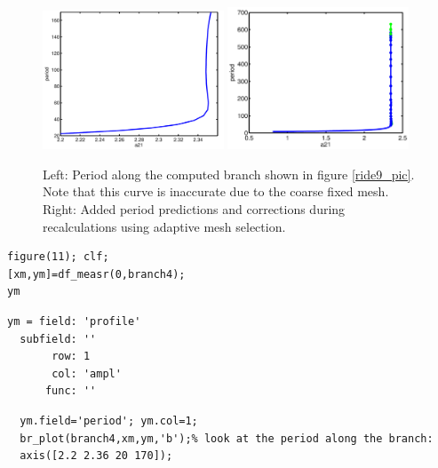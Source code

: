 \documentclass[10pt]{scrartcl}
\begin{document}
\begin{figure}[h]
\begin{center}
\includegraphics[width=0.48\textwidth]{fig/demo1figa11}
\includegraphics[width=0.48\textwidth]{fig/demo1fig11}
\end{center}
\caption{\label{ride11_pic}Left: Period along the computed branch
  shown in figure \ref{ride9_pic}. Note that this curve is inaccurate
  due to the coarse fixed mesh. Right: Added period predictions and
  corrections during recalculations using adaptive mesh selection.}
\end{figure}
\begin{lstlisting}
figure(11); clf;
[xm,ym]=df_measr(0,branch4); 
ym
\end{lstlisting}
{\small
\begin{verbatim}
ym = field: 'profile'
  subfield: ''
       row: 1
       col: 'ampl'
      func: ''
\end{verbatim}}
\begin{lstlisting}
  ym.field='period'; ym.col=1;
  br_plot(branch4,xm,ym,'b');% look at the period along the branch:
  axis([2.2 2.36 20 170]);
\end{lstlisting}
\end{document}
